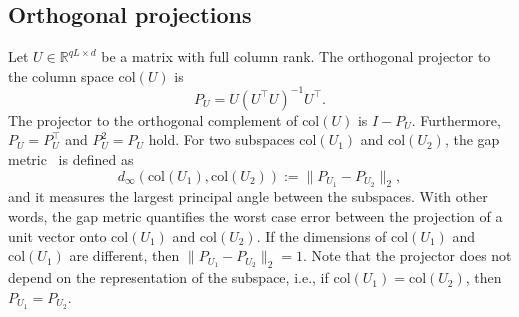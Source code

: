\documentclass[letterpaper, 10 pt, conference]{ieeeconf}
\begin{document}
\subsection{Orthogonal projections}
Let $U\in\mathbb{R}^{qL\times d}$ be a matrix with full column rank. The orthogonal projector to the column space $\mathrm{col}(U)$ is
        $$
        P_U = U(U^\top U )^{-1}U^\top.$$
The projector to the orthogonal complement of $\mathrm{col}(U)$ is $I-P_U$.
Furthermore, $P_U = P_U^\top$ and $P_U^2 = P_U$ hold.
For two subspaces $\mathrm{col}(U_1)$ and $\mathrm{col}(U_2)$, the gap metric~\cite{ye2016schubert} is defined as
$$
d_\infty(\mathrm{col}(U_1),\mathrm{col}(U_2)) := \|P_{U_1} - P_{U_2}\|_2,
$$
and it measures the largest principal angle between the subspaces.
With other words, the gap metric quantifies the worst case error between the projection of a unit vector onto $\mathrm{col}(U_1)$ and $\mathrm{col}(U_2)$.
If the dimensions of $\mathrm{col}(U_1)$ and $\mathrm{col}(U_1)$ are different, then $\|P_{U_1} - P_{U_2}\|_2 =1$.
Note that the projector does not depend on the representation of the subspace, i.e., if $\mathrm{col}(U_1) = \mathrm{col}(U_2)$, then $P_{U_1} = P_{U_2}$.
\end{document}
